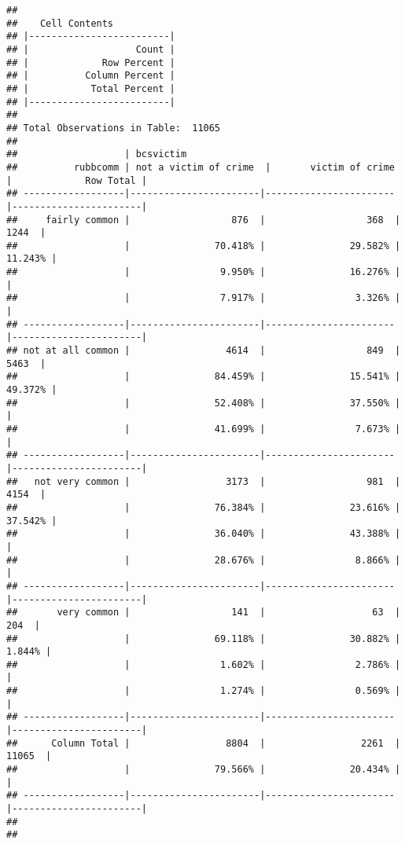 \documentclass[
]{book}
\begin{document}
\begin{verbatim}
## 
##    Cell Contents
## |-------------------------|
## |                   Count |
## |             Row Percent |
## |          Column Percent |
## |           Total Percent |
## |-------------------------|
## 
## Total Observations in Table:  11065 
## 
##                   | bcsvictim 
##          rubbcomm | not a victim of crime  |       victim of crime  |             Row Total | 
## ------------------|-----------------------|-----------------------|-----------------------|
##     fairly common |                  876  |                  368  |                 1244  | 
##                   |               70.418% |               29.582% |               11.243% | 
##                   |                9.950% |               16.276% |                       | 
##                   |                7.917% |                3.326% |                       | 
## ------------------|-----------------------|-----------------------|-----------------------|
## not at all common |                 4614  |                  849  |                 5463  | 
##                   |               84.459% |               15.541% |               49.372% | 
##                   |               52.408% |               37.550% |                       | 
##                   |               41.699% |                7.673% |                       | 
## ------------------|-----------------------|-----------------------|-----------------------|
##   not very common |                 3173  |                  981  |                 4154  | 
##                   |               76.384% |               23.616% |               37.542% | 
##                   |               36.040% |               43.388% |                       | 
##                   |               28.676% |                8.866% |                       | 
## ------------------|-----------------------|-----------------------|-----------------------|
##       very common |                  141  |                   63  |                  204  | 
##                   |               69.118% |               30.882% |                1.844% | 
##                   |                1.602% |                2.786% |                       | 
##                   |                1.274% |                0.569% |                       | 
## ------------------|-----------------------|-----------------------|-----------------------|
##      Column Total |                 8804  |                 2261  |                11065  | 
##                   |               79.566% |               20.434% |                       | 
## ------------------|-----------------------|-----------------------|-----------------------|
## 
## 
\end{verbatim}
\end{document}
